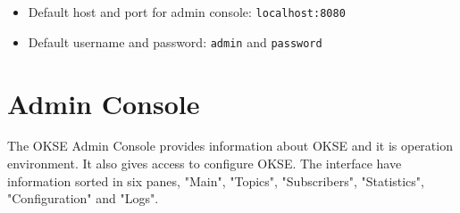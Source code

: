 \begin{itemize}
\setlength{\itemsep}{0cm}%
\item Default host and port for admin console: \verb!localhost:8080!
\item Default username and password: \verb!admin! and \verb!password!
\end{itemize}

\section{Admin Console}
The OKSE Admin Console provides information about OKSE and it is operation environment. It also gives access to configure OKSE. The interface have information sorted in six panes, "Main", "Topics", "Subscribers", "Statistics", "Configuration" and "Logs".

\clearpage

